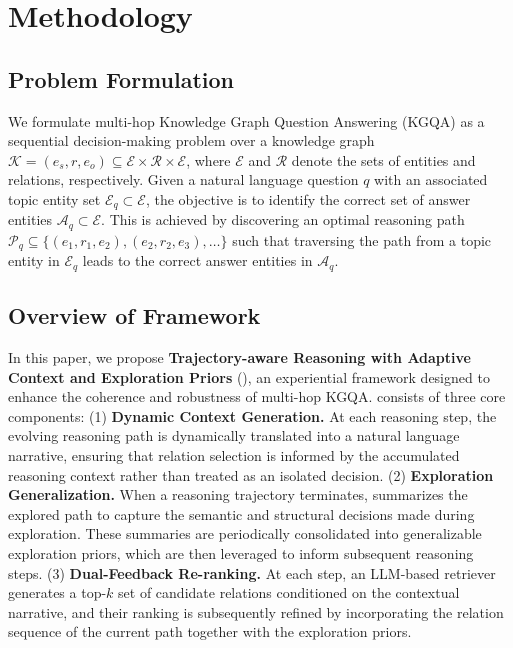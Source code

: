 \section{Methodology}



\subsection{Problem Formulation}

We formulate multi-hop Knowledge Graph Question Answering (KGQA) as a sequential decision-making problem over a knowledge graph $\mathcal{K} = {(e_s, r, e_o)} \subseteq \mathcal{E} \times \mathcal{R} \times \mathcal{E}$, where $\mathcal{E}$ and $\mathcal{R}$ denote the sets of entities and relations, respectively. Given a natural language question $q$ with an associated topic entity set $\mathcal{E}_q \subset \mathcal{E}$, the objective is to identify the correct set of answer entities $\mathcal{A}_q \subset \mathcal{E}$. This is achieved by discovering an optimal reasoning path $\mathcal{P}_q \subseteq \{(e_1, r_1, e_2), (e_2, r_2, e_3), \ldots\}$ such that traversing the path from a topic entity in $\mathcal{E}_q$ leads to the correct answer entities in $\mathcal{A}_q$.

\subsection{Overview of Framework}

In this paper, we propose \textbf{Trajectory-aware Reasoning with Adaptive Context and Exploration Priors} (\method{}), an experiential framework designed to enhance the coherence and robustness of multi-hop KGQA. \method{} consists of three core components: (1) \textbf{Dynamic Context Generation.} At each reasoning step, the evolving reasoning path is dynamically translated into a natural language narrative, ensuring that relation selection is informed by the accumulated reasoning context rather than treated as an isolated decision. (2) \textbf{Exploration Generalization.} When a reasoning trajectory terminates, \method{} summarizes the explored path to capture the semantic and structural decisions made during exploration. These summaries are periodically consolidated into generalizable exploration priors, which are then leveraged to inform subsequent reasoning steps. (3) \textbf{Dual-Feedback Re-ranking.} At each step, an LLM-based retriever generates a top-$k$ set of candidate relations conditioned on the contextual narrative, and their ranking is subsequently refined by incorporating the relation sequence of the current path together with the exploration priors.


